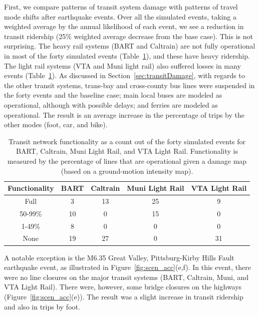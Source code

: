 First, we compare patterns of transit system damage with patterns of travel mode shifts after earthquake events. Over all the simulated events, taking a weighted average by the annual likelihood of each event, we see a reduction in transit ridership (25\% weighted average decrease from the base case). This is not surprising. The heavy rail systems (BART and Caltrain) are not fully operational in most of the forty simulated events (Table~\ref{tab:transit}), and these have heavy ridership. The light rail systems (VTA and Muni light rail) also suffered losses in many events (Table~\ref{tab:transit}). As discussed in Section~\ref{sec:transitDamage}, with regards to the other transit systems, trans-bay and cross-county bus lines were suspended in the forty events and the baseline case; main local buses are modeled as operational, although with possible delays; and ferries are modeled as operational.
 The result is an average increase in the percentage of trips by the other modes (foot, car, and bike). 

\begin{table}
\centering
\begin{tabular}{c||c|c|c|c}
\textbf{Functionality}           & \textbf{BART} & \textbf{Caltrain} & \textbf{Muni Light Rail} & \textbf{VTA Light Rail}  \\
\hline
Full & 3 & 13 & 25 & 9\\
50-99\%  & 10 & 0 & 15 & 0\\
1-49\%  & 8 & 0 & 0 & 0\\
None & 19 & 27 & 0 & 31\\
\end{tabular}
\caption{Transit network functionality as a count out of the forty simulated events for BART, Caltrain, Muni Light Rail, and VTA Light Rail. Functionality is measured by the percentage of lines that are operational given a damage map (based on a ground-motion intensity map). }
\label{tab:transit}
\end{table}



A notable exception is the M6.35 Great Valley, Pittsburg-Kirby Hills Fault earthquake event, as illustrated in Figure~\ref{fig:scen_acc}{(e,f)}. In this event, there were no line closures on the major transit systems (BART, Caltrain, Muni, and VTA Light Rail). There were, however, some bridge closures on the highways (Figure~\ref{fig:scen_acc}{(e)}). The result was a slight increase in transit ridership and also in trips by foot.

